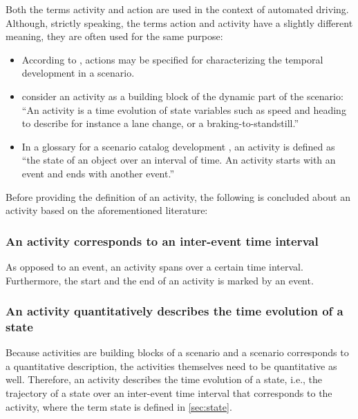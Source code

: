 \cbstart
Both the terms activity \cite{geyer2014, elrofai2018scenario, miller2015distraction, childress2015using, catapult2018musicc, sigsim2019glossary} and action \cite{geyer2014, ulbrich2015, bagschik2017ontology} are used in the context of automated driving. Although, strictly speaking, the terms action and activity have a slightly different meaning, they are often used for the same purpose:
\begin{itemize}
	\item According to \textcite{ulbrich2015}, actions may be specified for characterizing the temporal development in a scenario.
	\item \textcite{elrofai2018scenario} consider an activity as a building block of the dynamic part of the scenario: ``An activity is a time evolution of state variables such as speed and heading to describe for instance a lane change, or a braking-to-standstill.''
	\item In a glossary for a scenario catalog development \cite{catapult2018musicc}, an activity is defined as ``the state of an object over an interval of time. An activity starts with an event and ends with another event.''
\end{itemize}
\cbend

Before providing the definition of an activity, the following is concluded about an activity based on the aforementioned literature:

\subsubsection{An activity corresponds to an inter-event time interval}
As opposed to an event, an activity spans over a certain time interval. Furthermore, the start and the end of an activity is marked by an event.

\cbstart
\subsubsection{An activity quantitatively describes the time evolution of a state}
Because activities are building blocks of a scenario and a scenario corresponds to a quantitative description, the activities themselves need to be quantitative as well. 
Therefore, an activity describes the time evolution of a state, i.e., the trajectory of a state over an inter-event time interval that corresponds to the activity, where the term state is defined in \cref{sec:state}.

